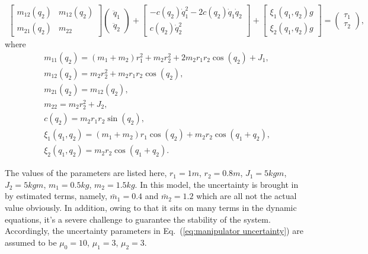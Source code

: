 \documentclass[3p]{elsarticle}
\theoremstyle{plain}
\theoremstyle{remark}
\begin{document}
\begin{align}
\begin{bmatrix}
m_{12}(q_2) &m_{12}(q_2)\\
m_{21}(q_2) &m_{22}
\end{bmatrix}
\begin{pmatrix}
\ddot q_1\\
\ddot q_2
\end{pmatrix}
+
\begin{bmatrix}
-c(q_2)\dot q_1^2-2c(q_2)\dot q_1\dot q_2\\
c(q_2)\dot q_2^2
\end{bmatrix}+
\begin{bmatrix}
\xi_1(q_1,q_2) g\\
\xi_2(q_1,q_2) g
\end{bmatrix}=
\begin{pmatrix}
\tau_1\\
\tau_2
\end{pmatrix},\label{eq:manipulator}
\end{align}
where
\begin{align*}
&m_{11}(q_2)=(m_1+m_2)r_1^2+m_2r_2^2+2m_2r_1r_2\cos(q_2)+J_1,\\
&m_{12}(q_2)=m_2r_2^2+m_2r_1r_2\cos(q_2),\\
&m_{21}(q_2)=m_{12}(q_2),\\
&m_{22}=m_2r_2^2+J_2,\\
&c(q_2)=m_2r_1r_2\sin(q_2),\\
&\xi_1(q_1,q_2) =(m_1+m_2)r_1\cos(q_2)+m_2r_2\cos(q_1+q_2),\\
&\xi_2(q_1,q_2) = m_2r_2\cos(q_1+q_2).
\end{align*}\par
The values of the parameters are listed here, $r_1=1m$, $r_2=0.8m$, $J_1=5 kgm$, $J_2=5kgm$, $m_1=0.5kg$, $m_2=1.5kg$. In this model, the uncertainty is brought in by estimated terms, namely, $\bar m_1=0.4$ and $\bar m_2=1.2$ which are all not the actual value obviously. In addition, owing to that it sits on many terms in the dynamic equations, it's a severe challenge to guarantee the stability of the system. Accordingly, the uncertainty parameters in Eq.~(\ref{eq:manipulator uncertainty}) are assumed to be $\mu_0=10$, $\mu_1=3$, $\mu_2=3$.
\end{document}
